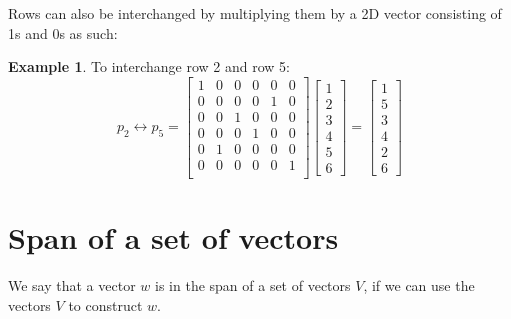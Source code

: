 \documentclass[table]{article}
\theoremstyle{definition}
\newtheorem{ex}{Example}[section]
\begin{document}
  Rows can also be interchanged by multiplying them by a 2D vector consisting of 1s and 0s as such:
  \begin{ex}
    To interchange row 2 and row 5:
    \begin{equation}
      p_2 \leftrightarrow p_5 =   \begin{bmatrix}
        1 & 0 & 0 & 0 & 0 & 0 \\
        0 & 0 & 0 & 0 & 1 & 0 \\
        0 & 0 & 1 & 0 & 0 & 0 \\
        0 & 0 & 0 & 1 & 0 & 0 \\
        0 & 1 & 0 & 0 & 0 & 0 \\
        0 & 0 & 0 & 0 & 0 & 1 \\
        \end{bmatrix}
          \begin{bmatrix}
            1 \\ 2 \\ 3 \\ 4 \\ 5 \\ 6
          \end{bmatrix}
        =   \begin{bmatrix}
            1 \\ 5 \\ 3 \\ 4 \\ 2 \\ 6
          \end{bmatrix}
    \end{equation}
  \end{ex}
  
  
  \section{Span of a set of vectors}
  We say that a vector $w$ is in the span of a set of vectors $V$, if we can use the vectors $V$ to construct $w$.
  
\end{document}
